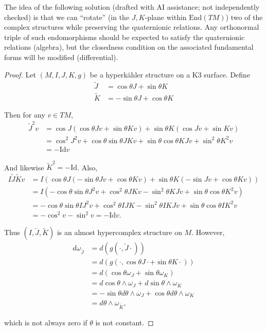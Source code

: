 \noindent
The idea of the following solution
(drafted with AI assistance; not independently checked)
is that we can ``rotate''
(in the $J,K$-plane within $\text{End}(TM)$)
two of the complex structures while
preserving the
quaternionic relations.
Any orthonormal triple of such endomorphisms
should be expected to satisfy the
quaternionic relations (algebra),
but the closedness condition on the
associated fundamental
forms will be modified (differential).

\begin{proof}
Let $(M,I,J,K,g)$ be a hyperkähler structure
on a K3 surface.
Define
$$
\begin{aligned}
\tilde{J}&=\cos \theta J+ \sin \theta K\\
\tilde{K}&=-\sin \theta J + \cos \theta K
\end{aligned}
$$

\noindent
Then for any $v \in TM$,
$$
\begin{aligned}
\tilde{J}^2v&=\cos J(\cos \theta Jv+ \sin
\theta Kv)
+\sin \theta K (\cos J v + \sin Kv)\\
&=\cos^2J^2v+\cos \theta \sin \theta J K v
+ \sin \theta \cos \theta K J v + \sin^2
\theta K^2 v\\
&=-\text{Id} v
\end{aligned}
$$

\noindent
And likewise $\tilde{K}^2=-\text{Id}$.
Also,
$$
\begin{aligned}
I \tilde{J} \tilde{K}v&=
I(\cos\theta J(-\sin \theta Jv+\cos \theta
Kv)
+\sin \theta K (- \sin Jv+ \cos \theta Kv))\\
&=I (-\cos \theta \sin \theta J^2 v
+ \cos^2 \theta J K v
- \sin^2 \theta K J v
+\sin \theta \cos \theta K^2 v)\\
&=-\cos \theta \sin \theta I J^2 v
+ \cos^2 \theta I J K
- \sin^2 \theta I K J v
+ \sin \theta \cos \theta I K^2 v\\
&=-\cos^2v- \sin^2v=-\text{Id}v.
\end{aligned}
$$

\noindent
Thus $(I,\tilde{J},\tilde{K})$ is an almost
hypercomplex
structure on $M$.
However,
$$
\begin{aligned}
d
\omega_{\tilde{J}}&=d(g(\cdot,\tilde{J}\cdot)
)\\
&=d(g(\cdot,\cos \theta J\cdot + \sin \theta
K\cdot))\\
&=d(\cos \theta \omega_J + \sin \theta
\omega_K)\\
&=d \cos \theta \wedge \omega_J + d \sin
\theta \wedge \omega_K\\
&=-\sin \theta
d\theta\wedge\omega_J+\cos\theta
d\theta\wedge\omega_K\\
&=d \theta \wedge \omega_{\tilde{K}},
\end{aligned}
$$

\noindent
which is not always zero if $\theta$ is not
constant.
\end{proof}

